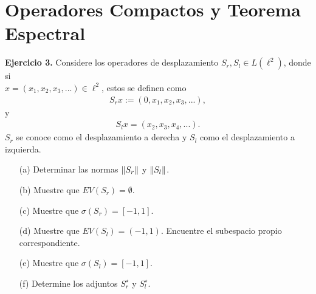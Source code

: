 \section{Operadores Compactos y Teorema Espectral}

\textbf{Ejercicio 3.} Considere los operadores de desplazamiento $S_r,S_l\in L(\ell^2)$, donde si\\ $x=(x_1,x_2,x_3,...)\in \ell^2$, estos se definen como
\begin{align*}
    S_rx:=(0,x_1,x_2,x_3,...),
\end{align*}
y
\begin{align*}
    S_lx=(x_2,x_3,x_4,...).
\end{align*}
$S_r$ se conoce como el desplazamiento a derecha y $S_l$ como el desplazamiento a izquierda.

\begin{enumerate}
    \item[(a)] Determinar las normas $\left\|S_r\right\|$ y $\left\|S_l\right\|$.
    \item[(b)] Muestre que $EV(S_r)=\emptyset$.
    \item[(c)] Muestre que $\sigma(S_r)=[-1,1]$.
    \item[(d)] Muestre que $EV(S_l)=(-1,1)$. Encuentre el subespacio propio correspondiente.
    \item[(e)] Muestre que $\sigma(S_l)=[-1,1]$.
    \item[(f)] Determine los adjuntos $S_r^\star$ y $S_l^\star$.
\end{enumerate}
